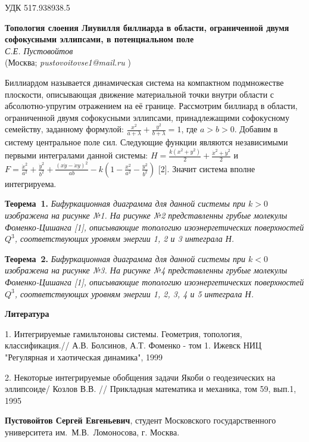 \small УДК 517.938938.5

\begin{center}{ \bf  Топология слоения Лиувилля биллиарда в области, ограниченной двумя софокусными эллипсами, в потенциальном поле}\\
{\it С.Е. Пустовойтов } \\
(Москва; {\it pustovoitovse1@mail.ru} )
\end{center}


Биллиардом называется динамическая система на компактном подмножестве плоскости, описывающая  движение материальной точки внутри области  с абсолютно-упругим отражением на её границе. Рассмотрим биллиард в области, ограниченной двумя софокусными эллипсами, принадлежащими софокусному семейству, заданному формулой: $\frac{x^2}{a+\lambda}+\frac{y
^2}{b+\lambda}=1$, где $a>b>0$. Добавим в систему центральное поле сил. Следующие функции являются независимыми первыми интегралами данной системы: $H=\frac{k(x^2+y^2)}{2}+\frac{\dot{x}^2+\dot{y}^2}{2}$ и $F=\frac{\dot{x}^2}{a^2}+\frac{\dot{y}^2}{b^2}+\frac{(x\dot{y}-\dot{x}y)^2}{ab}-k(1-\frac{x^2}{a^2}-\frac{y^2}{b^2})$ [2]. Значит система вполне интегрируема.

\textbf{Теорема~1.} {\it Бифуркационная диаграмма для данной системы при $k>0$ изображена на рисунке №1. На рисунке №2 представленны грубые молекулы Фоменко-Цишанга [1], описывающие топологию изоэнергетических поверхностей $Q^3$, соответствующих уровням энергии 1, 2 и 3 интеграла Н.
}

\textbf{Теорема~2.} {\it Бифуркационная диаграмма для данной системы при $k<0$ изображена на рисунке №3. На рисунке №4 представленны грубые молекулы Фоменко-Цишанга [1], описывающие топологию изоэнергетических поверхностей $Q^3$, соответствующих уровням энергии 1, 2, 3, 4 и 5 интеграла Н.
}

\smallskip \centerline{\bf Литература}\nopagebreak

1. Интегрируемые гамильтоновы системы. Геометрия, топология, классификация.// 	А.В. Болсинов, А.Т. Фоменко - том 1. Ижевск НИЦ	"Регулярная и хаотическая динамика", 1999

2. Некоторые интегрируемые обобщения задачи Якоби о геодезических на эллипсоиде/  Козлов В.В. // Прикладная математика и механика, том 59, вып.1, 1995

{\bf Пустовойтов Сергей Евгеньевич}, студент Московского государственного университета им.~М.В.~Ломоносова, г. Москва.

